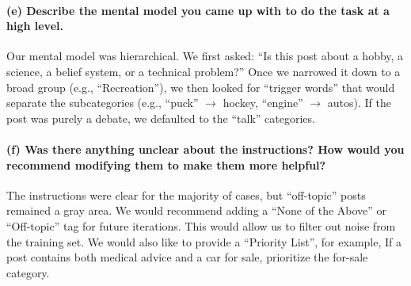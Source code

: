 \documentclass{article}
\begin{document}
\paragraph{(e) Describe the mental model you came up with to do the task at a high level.}
Our mental model was hierarchical. We first asked: ``Is this post about a hobby, a science, a belief system, or a technical problem?'' Once we narrowed it down to a broad group (e.g., ``Recreation''), we then looked for ``trigger words'' that would separate the subcategories (e.g., ``puck'' $\rightarrow$ hockey, ``engine'' $\rightarrow$ autos). If the post was purely a debate, we defaulted to the ``talk'' categories.

\paragraph{(f) Was there anything unclear about the instructions? How would you recommend modifying them to make them more helpful?}
The instructions were clear for the majority of cases, but ``off-topic'' posts remained a gray area. We would recommend adding a ``None of the Above'' or ``Off-topic'' tag for future iterations. This would allow us to filter out noise from the training set. We would also like to provide a ``Priority List'', for example, If a post contains both medical advice and a car for sale, prioritize the for-sale category.
\end{document}
